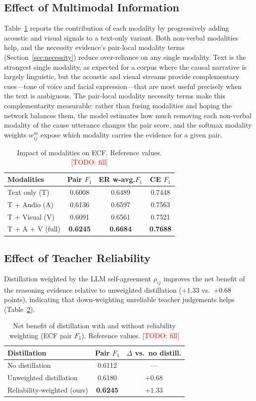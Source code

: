 \documentclass[journal]{IEEEtran}
\newcommand{\todo}[1]{\textcolor{red}{[TODO: #1]}}
\begin{document}
\subsection{Effect of Multimodal Information}
Table~\ref{tab:modality} reports the contribution of each modality by progressively adding
acoustic and visual signals to a text-only variant. Both non-verbal modalities help, and the
necessity evidence's pair-local modality terms (Section~\ref{sec:necessity}) reduce
over-reliance on any single modality. %
Text is the strongest single modality, as expected for a corpus where the causal narrative is
largely linguistic, but the acoustic and visual streams provide complementary cues---tone of
voice and facial expression---that are most useful precisely when the text is ambiguous. The
pair-local modality necessity terms make this complementarity measurable: rather than fusing
modalities and hoping the network balances them, the model estimates how much removing each
non-verbal modality of the cause utterance changes the pair score, and the softmax modality
weights $w_{ij}^{m}$ expose which modality carries the evidence for a given pair.
\begin{table}[t]
\centering
\caption{Impact of modalities on ECF. Reference values. \todo{fill}}
\label{tab:modality}
\begin{tabular}{lccc}
\toprule
Modalities & Pair $F_1$ & ER w-avg.$F_1$ & CE $F_1$ \\
\midrule
Text only (T)        & 0.6008 & 0.6489 & 0.7448 \\
T + Audio (A)        & 0.6136 & 0.6597 & 0.7563 \\
T + Visual (V)       & 0.6091 & 0.6561 & 0.7521 \\
T + A + V (full)     & \textbf{0.6245} & \textbf{0.6684} & \textbf{0.7688} \\
\bottomrule
\end{tabular}
\end{table}

\subsection{Effect of Teacher Reliability}
Distillation weighted by the LLM self-agreement $\rho_{ij}$ improves the net benefit of the
reasoning evidence relative to unweighted distillation ($+1.33$ vs.\ $+0.68$ points),
indicating that down-weighting unreliable teacher judgements helps
(Table~\ref{tab:reliability}). %
\begin{table}[t]
\centering
\caption{Net benefit of distillation with and without reliability weighting (ECF pair $F_1$).
Reference values. \todo{fill}}
\label{tab:reliability}
\begin{tabular}{lcc}
\toprule
Distillation & Pair $F_1$ & $\Delta$ vs.\ no distill. \\
\midrule
No distillation              & 0.6112 & --- \\
Unweighted distillation      & 0.6180 & $+0.68$ \\
Reliability-weighted (ours)  & \textbf{0.6245} & $+1.33$ \\
\bottomrule
\end{tabular}
\end{table}
\end{document}
